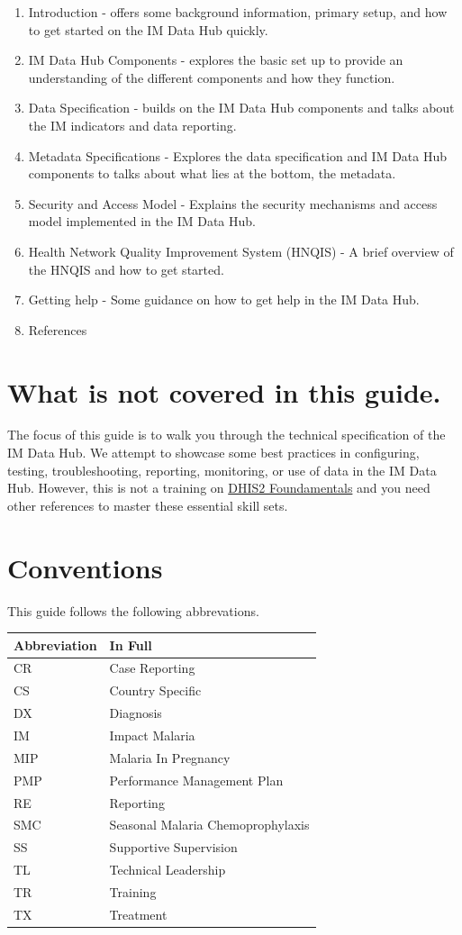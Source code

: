 \documentclass[]{book}
\providecommand{\tightlist}{%
  \setlength{\itemsep}{0pt}\setlength{\parskip}{0pt}}
\begin{document}
\begin{enumerate}
\def\labelenumi{\arabic{enumi}.}
\tightlist
\item
  Introduction - offers some background information, primary setup, and how to get started on the IM Data Hub quickly.
\item
  IM Data Hub Components - explores the basic set up to provide an understanding of the different components and how they function.
\item
  Data Specification - builds on the IM Data Hub components and talks about the IM indicators and data reporting.
\item
  Metadata Specifications - Explores the data specification and IM Data Hub components to talks about what lies at the bottom, the metadata.
\item
  Security and Access Model - Explains the security mechanisms and access model implemented in the IM Data Hub.
\item
  Health Network Quality Improvement System (HNQIS) - A brief overview of the HNQIS and how to get started.
\item
  Getting help - Some guidance on how to get help in the IM Data Hub.
\item
  References
\end{enumerate}

\hypertarget{what-is-not-covered-in-this-guide.}{%
\section{What is not covered in this guide.}\label{what-is-not-covered-in-this-guide.}}

The focus of this guide is to walk you through the technical specification of the IM Data Hub. We attempt to showcase some best practices in configuring, testing, troubleshooting, reporting, monitoring, or use of data in the IM Data Hub. However, this is not a training on \href{https://academy.dhis2.org/courses/HISP/DHIS2_Level1/2015_Q1/about}{DHIS2 Foundamentals} and you need other references to master these essential skill sets.

\hypertarget{conventions}{%
\section{Conventions}\label{conventions}}

This guide follows the following abbrevations.

\begin{longtable}[]{@{}ll@{}}
\toprule
Abbreviation & In Full\tabularnewline
\midrule
\endhead
CR & Case Reporting\tabularnewline
CS & Country Specific\tabularnewline
DX & Diagnosis\tabularnewline
IM & Impact Malaria\tabularnewline
MIP & Malaria In Pregnancy\tabularnewline
PMP & Performance Management Plan\tabularnewline
RE & Reporting\tabularnewline
SMC & Seasonal Malaria Chemoprophylaxis\tabularnewline
SS & Supportive Supervision\tabularnewline
TL & Technical Leadership\tabularnewline
TR & Training\tabularnewline
TX & Treatment\tabularnewline
\bottomrule
\end{longtable}
\end{document}

